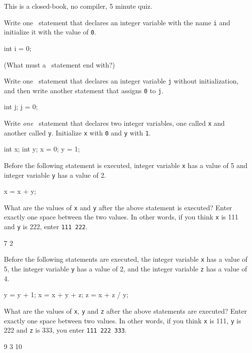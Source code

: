 

This is a closed-book, no compiler, 5 minute quiz.

\nextq
Write one \cpp\ statement that
declares an integer variable with the name
\verb!i! and initialize it with the value of \verb!0!.
\\
\ANSWER
\begin{answercode}
int i = 0;
\end{answercode}
(What must a \cpp\ statement end with?)

\nextq
Write one \cpp\ statement that declares an integer variable \verb!j!
without initialization, and then write another statement that
assigns \verb!0! to \verb!j!.
\\
\ANSWER
\begin{answercode}
int j;
j = 0;
\end{answercode}

\nextq
Write \textit{one} \cpp\ statement that declares two integer variables,
one called \texttt{x} and another called \texttt{y}.
Initialize \texttt{x} with \texttt{0} and \texttt{y} with \texttt{1}.
\\
\ANSWER
\begin{answercode}
int x;
int y;
x = 0;
y = 1;
\end{answercode}

\nextq
Before the following statement is executed,
integer variable \verb!x! has a value of 5
and integer variable \verb!y! has a value of 2.
\begin{console}[fontsize=\footnotesize]
x = x + y;
\end{console}
What are the values of \verb!x! and \verb!y! after the above statement is
executed?
Enter exactly one space between the two values.
In other words, if you think \verb!x! is 111 and \verb!y! is 222,
enter \verb!111 222!.
\\
\ANSWER
\begin{answercode}
7 2
\end{answercode}

\nextq
Before the following statements are executed,
the integer variable \verb!x! has a value of 5,
the integer variable \verb!y! has a value of 2, and
the integer variable \verb|z| has a value of 4.
\begin{console}[fontsize=\footnotesize]
y = y + 1;
x = x + y + z;
z = x + z / y;
\end{console}
What are the values of \verb!x!, \verb!y! and \verb!z!
after the above statements are executed?
Enter exactly one space between two values.
In other words, if you think \verb!x! is 111, \verb!y! is 222 and \verb!z! is 333,
you enter \verb!111 222 333!.
\\
\ANSWER
\begin{answercode}
9 3 10
\end{answercode}


